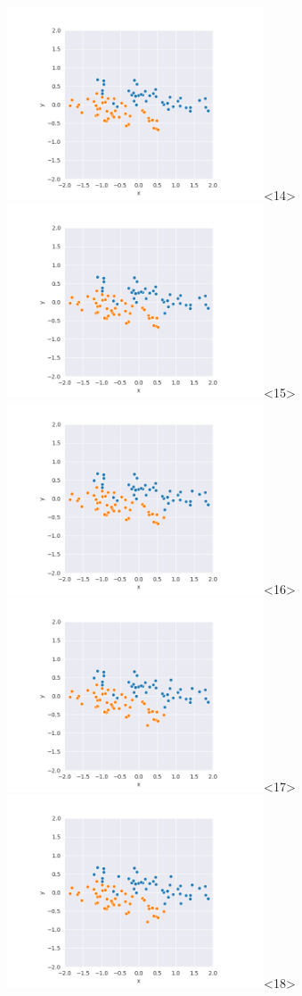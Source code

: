 \begin{frame}
  \includegraphics[width=3in]{../png/single_stretch/single_stretch_66.png}<14>
  \includegraphics[width=3in]{../png/single_stretch/single_stretch_71.png}<15>
  \includegraphics[width=3in]{../png/single_stretch/single_stretch_76.png}<16>
  \includegraphics[width=3in]{../png/single_stretch/single_stretch_81.png}<17>
  \includegraphics[width=3in]{../png/single_stretch/single_stretch_86.png}<18>

\end{frame}
